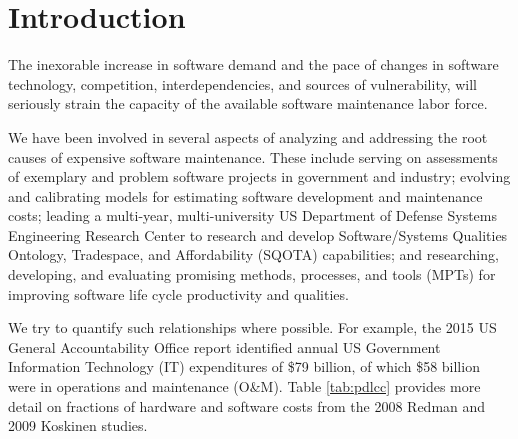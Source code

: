 \section{Introduction}
\label{sec:introudction}

The inexorable increase in software demand and the pace of changes in software technology, competition, interdependencies, and sources of vulnerability, will seriously strain the capacity of the available software maintenance labor force.

We have been involved in several aspects of analyzing and addressing the root causes of expensive software maintenance.
These include serving on assessments of
exemplary and
problem software projects in government and industry;
evolving and calibrating models for estimating software development and maintenance costs;
leading a multi-year, multi-university US Department of Defense Systems Engineering Research Center to research and develop Software/Systems Qualities Ontology, Tradespace, and Affordability (SQOTA) capabilities;
and researching, developing, and evaluating promising methods, processes, and tools (MPTs) for improving software life cycle productivity and qualities.

We try to quantify such relationships where possible.
For example, the 2015 US General Accountability Office report \citep{dodaro2015government} identified annual US Government Information Technology (IT) expenditures of \$79 billion, of which \$58 billion were in operations and maintenance (O\&M).
Table \ref{tab:pdlcc} provides more detail on fractions of hardware and software costs from the 2008 Redman \citep{redman2008weapon} and  2009 Koskinen \citep{koskinen2009software} studies.


\begin{table}[htbp]
	\centering
	\caption{Percentage of Post-Deployment Life Cycle Cost}
	\label{tab:pdlcc}
	\vspace{-0.3cm}
\end{table}%

